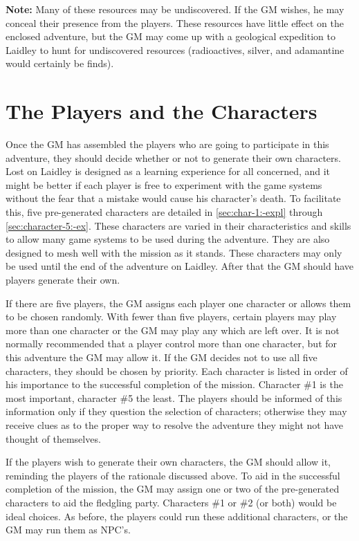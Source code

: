 \textbf{Note:} Many of these resources may be undiscovered. If the GM
wishes, he may conceal their presence from the players. These
resources have little effect on the enclosed adventure, but the GM may
come up with a geological expedition to Laidley to hunt for
undiscovered resources (radioactives, silver, and adamantine would
certainly be finds).


\section{The Players and the Characters}
\label{sec:players-characters}

Once the GM has assembled the players who are going to participate in
this adventure, they should decide whether or not to generate their
own characters. Lost on Laidley is designed as a learning experience
for all concerned, and it might be better if each player is free to
experiment with the game systems without the fear that a mistake would
cause his character's death. To facilitate this, five pre-generated
characters are detailed in \ref{sec:char-1:-expl} through
\ref{sec:character-5:-ex}.  These characters are varied in their
characteristics and skills to allow many game systems to be used
during the adventure. They are also designed to mesh well with the
mission as it stands. These characters may only be used until the end
of the adventure on Laidley. After that the GM should have players
generate their own.

If there are five players, the GM assigns each player one character or
allows them to be chosen randomly. With fewer than five players,
certain players may play more than one character or the GM may play
any which are left over. It is not normally recommended that a player
control more than one character, but for this adventure the GM may
allow it. If the GM decides not to use all five characters, they
should be chosen by priority. Each character is listed in order of his
importance to the successful completion of the mission. Character \#1
is the most important, character \#5 the least. The players should be
informed of this information only if they question the selection of
characters; otherwise they may receive clues as to the proper way to
resolve the adventure they might not have thought of themselves.

If the players wish to generate their own characters, the GM should
allow it, reminding the players of the rationale discussed above. To
aid in the successful completion of the mission, the GM may assign one
or two of the pre-generated characters to aid the fledgling party.
Characters \#1 or \#2 (or both) would be ideal choices. As before, the
players could run these additional characters, or the GM may run them
as NPC's.


